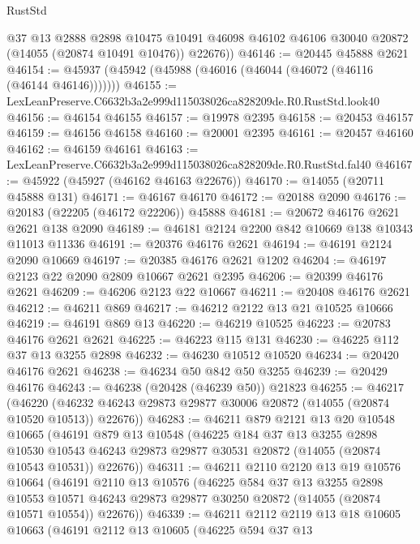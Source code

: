 \begin{lexlean}{RustStd}
\begin{coremodule}
        @37
        @13
        @2888
        @2898
        @10475
        @10491
        @46098
        @46102
        @46106
        @30040
        @20872
        (@14055 (@20874 @10491 @10476))
        @22676))
@46146 := @20445 @45888 @2621
@46154 := @45937 (@45942 (@45988 (@46016 (@46044 (@46072 (@46116 (@46144 @46146)))))))
@46155 := LexLeanPreserve.C6632b3a2e999d115038026ca828209de.R0.RustStd.look40
@46156 := @46154 @46155
@46157 := @19978 @2395
@46158 := @20453 @46157
@46159 := @46156 @46158
@46160 := @20001 @2395
@46161 := @20457 @46160
@46162 := @46159 @46161
@46163 := LexLeanPreserve.C6632b3a2e999d115038026ca828209de.R0.RustStd.fal40
@46167 := @45922 (@45927 (@46162 @46163 @22676))
@46170 := @14055 (@20711 @45888 @131)
@46171 := @46167 @46170
@46172 := @20188 @2090
@46176 := @20183 (@22205 (@46172 @22206)) @45888
@46181 := @20672 @46176 @2621 @2621 @138 @2090
@46189 := @46181 @2124 @2200 @842 @10669 @138 @10343 @11013 @11336
@46191 := @20376 @46176 @2621
@46194 := @46191 @2124 @2090 @10669
@46197 := @20385 @46176 @2621 @1202
@46204 := @46197 @2123 @22 @2090 @2809 @10667 @2621 @2395
@46206 := @20399 @46176 @2621
@46209 := @46206 @2123 @22 @10667
@46211 := @20408 @46176 @2621
@46212 := @46211 @869
@46217 := @46212 @2122 @13 @21 @10525 @10666
@46219 := @46191 @869 @13
@46220 := @46219 @10525
@46223 := @20783 @46176 @2621 @2621
@46225 := @46223 @115 @131
@46230 := @46225 @112 @37 @13 @3255 @2898
@46232 := @46230 @10512 @10520
@46234 := @20420 @46176 @2621
@46238 := @46234 @50 @842 @50 @3255
@46239 := @20429 @46176
@46243 := @46238 (@20428 (@46239 @50)) @21823
@46255 := @46217
    (@46220 (@46232 @46243 @29873 @29877 @30006 @20872 (@14055 (@20874 @10520 @10513)) @22676))
@46283 := @46211
    @879
    @2121
    @13
    @20
    @10548
    @10665
    (@46191
      @879
      @13
      @10548
      (@46225
        @184
        @37
        @13
        @3255
        @2898
        @10530
        @10543
        @46243
        @29873
        @29877
        @30531
        @20872
        (@14055 (@20874 @10543 @10531))
        @22676))
@46311 := @46211
    @2110
    @2120
    @13
    @19
    @10576
    @10664
    (@46191
      @2110
      @13
      @10576
      (@46225
        @584
        @37
        @13
        @3255
        @2898
        @10553
        @10571
        @46243
        @29873
        @29877
        @30250
        @20872
        (@14055 (@20874 @10571 @10554))
        @22676))
@46339 := @46211
    @2112
    @2119
    @13
    @18
    @10605
    @10663
    (@46191
      @2112
      @13
      @10605
      (@46225
        @594
        @37
        @13

\end{coremodule}
\end{lexlean}
